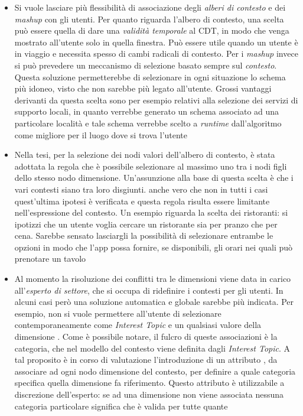 \begin{itemize}
	\item
	Si vuole lasciare più flessibilità di associazione degli \emph{alberi di contesto} e dei \emph{mashup} con gli utenti. Per quanto riguarda l'albero di contesto, una scelta può essere quella di dare una \emph{validità temporale} al CDT, in modo che venga mostrato all'utente solo in quella finestra. Può essere utile quando un utente è in viaggio e necessita spesso di cambi radicali di contesto. Per i \emph{mashup} invece si può prevedere un meccanismo di selezione basato sempre sul \emph{contesto}. Questa soluzione permetterebbe di selezionare in ogni situazione lo schema più idoneo, visto che non sarebbe più legato all'utente. Grossi vantaggi derivanti da questa scelta sono per esempio relativi alla selezione dei servizi di supporto locali, in quanto verrebbe generato un schema associato ad una particolare località e tale schema verrebbe scelto a \emph{runtime} dall'algoritmo come migliore per il luogo dove si trova l'utente
	\item
	Nella tesi, per la selezione dei nodi valori dell'albero di contesto, è stata adottata la regola che è possibile selezionare al massimo uno tra i nodi figli dello stesso nodo dimensione. Un'assunzione alla base di questa scelta è che i vari contesti siano tra loro disgiunti. \upe anche vero che non in tutti i casi quest'ultima ipotesi è verificata e questa regola risulta essere limitante nell'espressione del contesto. Un esempio riguarda la scelta dei ristoranti: si ipotizzi che un utente voglia cercare un ristorante sia per pranzo che per cena. Sarebbe sensato lasciargli la possibilità di selezionare entrambe le opzioni in modo che l'app possa fornire, se disponibili, gli orari nei quali può prenotare un tavolo
	\item 
	Al momento la risoluzione dei conflitti tra le dimensioni viene data in carico all'\emph{esperto di settore}, che si occupa di ridefinire i contesti per gli utenti. In alcuni casi però una soluzione automatica e globale sarebbe più indicata. Per esempio, non si vuole permettere all'utente di selezionare contemporaneamente come \emph{Interest Topic}  e un qualsiasi valore della dimensione . Come è possibile notare, il fulcro di queste associazioni è la categoria, che nel modello del contesto viene definita dagli \emph{Interest Topic}. A tal proposito è in corso di valutazione l'introduzione di un attributo , da associare ad ogni nodo dimensione del contesto, per definire a quale categoria specifica quella dimensione fa riferimento. Questo attributo è utilizzabile a discrezione dell'esperto: se ad una dimensione non viene associata nessuna categoria particolare significa che è valida per tutte quante

\end{itemize}
